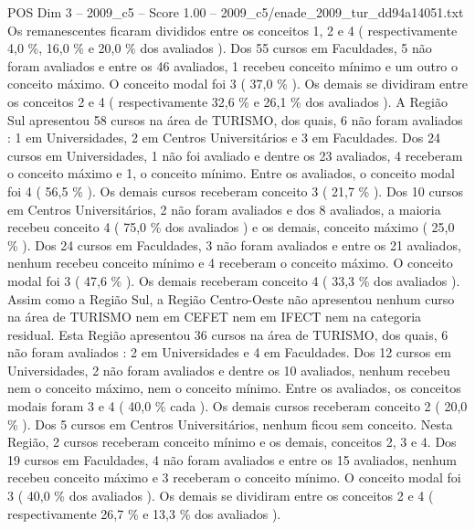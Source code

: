 \begin{textsample}{POS Dim 3 – 2009\_c5 – Score 1.00 – 2009\_c5/enade\_2009\_tur\_dd94a14051.txt}
Os remanescentes ficaram divididos entre os conceitos 1, 2 e 4 ( respectivamente 4,0 \%, 16,0 \% e 20,0 \% dos avaliados ).
Dos 55 cursos em Faculdades, 5 não foram avaliados e entre os 46 avaliados, 1 recebeu conceito mínimo e um outro o conceito máximo.
O conceito modal foi 3 ( 37,0 \% ).
Os demais se dividiram entre os conceitos 2 e 4 ( respectivamente 32,6 \% e 26,1 \% dos avaliados ).
A Região Sul apresentou 58 cursos na área de TURISMO, dos quais, 6 não foram avaliados : 1 em Universidades, 2 em Centros Universitários e 3 em Faculdades.
Dos 24 cursos em Universidades, 1 não foi avaliado e dentre os 23 avaliados, 4 receberam o conceito máximo e 1, o conceito mínimo.
Entre os avaliados, o conceito modal foi 4 ( 56,5 \% ).
Os demais cursos receberam conceito 3 ( 21,7 \% ).
Dos 10 cursos em Centros Universitários, 2 não foram avaliados e dos 8 avaliados, a maioria recebeu conceito 4 ( 75,0 \% dos avaliados ) e os demais, conceito máximo ( 25,0 \% ).
Dos 24 cursos em Faculdades, 3 não foram avaliados e entre os 21 avaliados, nenhum recebeu conceito mínimo e 4 receberam o conceito máximo.
O conceito modal foi 3 ( 47,6 \% ).
Os demais receberam conceito 4 ( 33,3 \% dos avaliados ).
Assim como a Região Sul, a Região Centro-Oeste não apresentou nenhum curso na área de TURISMO nem em CEFET nem em IFECT nem na categoria residual.
Esta Região apresentou 36 cursos na área de TURISMO, dos quais, 6 não foram avaliados : 2 em Universidades e 4 em Faculdades.
Dos 12 cursos em Universidades, 2 não foram avaliados e dentre os 10 avaliados, nenhum recebeu nem o conceito máximo, nem o conceito mínimo.
Entre os avaliados, os conceitos modais foram 3 e 4 ( 40,0 \% cada ).
Os demais cursos receberam conceito 2 ( 20,0 \% ).
Dos 5 cursos em Centros Universitários, nenhum ficou sem conceito.
Nesta Região, 2 cursos receberam conceito mínimo e os demais, conceitos 2, 3 e 4.
Dos 19 cursos em Faculdades, 4 não foram avaliados e entre os 15 avaliados, nenhum recebeu conceito máximo e 3 receberam o conceito mínimo.
O conceito modal foi 3 ( 40,0 \% dos avaliados ).
Os demais se dividiram entre os conceitos 2 e 4 ( respectivamente 26,7 \% e 13,3 \% dos avaliados ).

\end{textsample}
